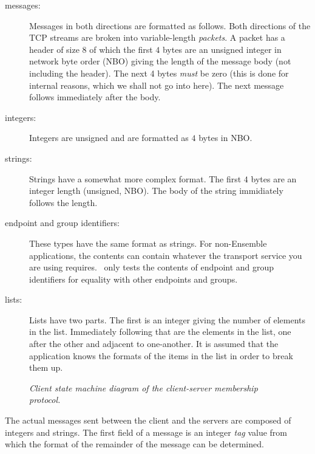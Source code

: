 \begin{description}
\item
[messages:] Messages in both directions are formatted as follows.
Both directions of the TCP streams are broken into variable-length
{\it packets}.  A packet has a header of size $8$ of which the first
$4$ bytes are an unsigned integer in network byte order (NBO) giving
the length of the message body (not including the header).  The next 4
bytes {\it must} be zero (this is done for internal reasons, which we
shall not go into here). The next message follows immediately after
the body.
\item
[integers:] Integers are unsigned and are formatted as $4$ bytes in
NBO.
\item
[strings:] Strings have a somewhat more complex format.
The first $4$ bytes are an integer length (unsigned, NBO).  
The body of the string immidiately follows
the length.
\item
[endpoint and group identifiers:] These types have the same format as
strings.  For non-Ensemble applications, the contents can contain
whatever the transport service you are using requires.  \ensemble\
only tests the contents of endpoint and group identifiers for
equality with other endpoints and groups.
\item
[lists:] Lists have two parts.  The first is an integer giving the
number of elements in the list.  Immediately following that are the
elements in the list, one after the other and adjacent to
one-another.  It is assumed that the application knows the formats of
the items in the list in order to break them up.
\end{description}

\begin{figure}[tb]
\begin{center}
\end{center}
\caption{\em Client state machine diagram of the client-server membership protocol.}
\label{fig:state}
\end{figure}

The actual messages sent between the client and the servers are
composed of integers and strings.  The first field of a message is an
integer \emph{tag} value from which the format of the remainder of the
message can be determined.

